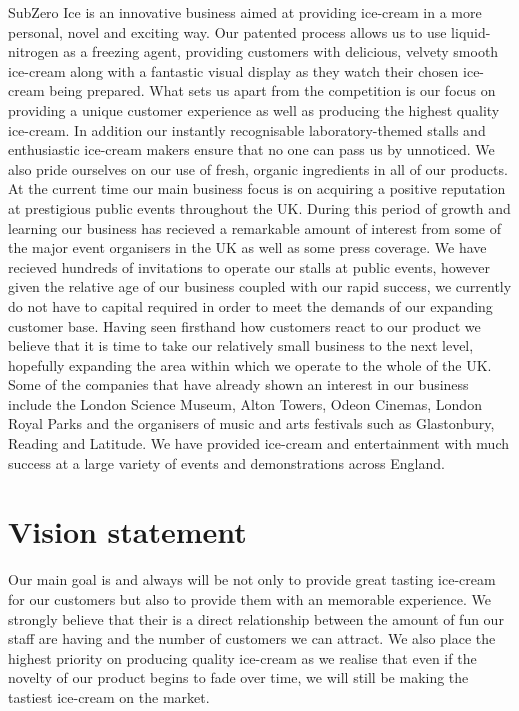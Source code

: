\documentclass{article}
\begin{document}
SubZero Ice is an innovative business aimed at providing ice-cream in a more personal, novel and exciting way. Our patented process allows us to use liquid-nitrogen as a freezing agent, providing customers with delicious, velvety smooth ice-cream along with a fantastic visual display as they watch their chosen ice-cream being prepared. What sets us apart from the competition is our focus on providing a unique customer experience as well as producing the highest quality ice-cream. In addition our instantly recognisable laboratory-themed stalls and enthusiastic ice-cream makers ensure that no one can pass us by unnoticed. We also pride ourselves on our use of fresh, organic ingredients in all of our products. \\

At the current time our main business focus is on acquiring a positive reputation at prestigious public events throughout the UK. During this period of growth and learning our business has recieved a remarkable amount of interest from some of the major event organisers in the UK as well as some press coverage. We have recieved hundreds of invitations to operate our stalls at public events, however given the relative age of our business coupled with our rapid success, we currently do not have to capital required in order to meet the demands of our expanding customer base. Having seen firsthand how customers react to our product we believe that it is time to take our relatively small business to the next level, hopefully expanding the area within which we operate to the whole of the UK. \\

Some of the companies that have already shown an interest in our business include the London Science Museum, Alton Towers, Odeon Cinemas, London Royal Parks and the organisers of music and arts festivals such as Glastonbury, Reading and Latitude. We have provided ice-cream and entertainment with much success at a large variety of events and demonstrations across England.


\section{Vision statement}

Our main goal is and always will be not only to provide great tasting ice-cream for our customers but also to provide them with an memorable experience. We strongly believe that their is a direct relationship between the amount of fun our staff are having and the number of customers we can attract. We also place the highest priority on producing quality ice-cream as we realise that even if the novelty of our product begins to fade over time, we will still be making the tastiest ice-cream on the market. \\
\end{document}

